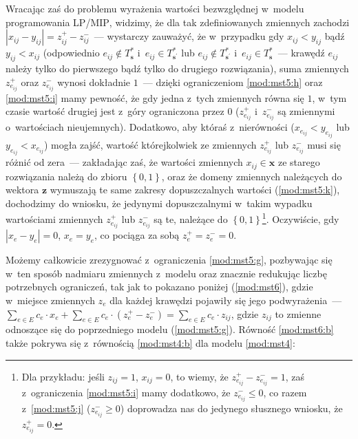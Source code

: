 Wracając zaś do problemu wyrażenia wartości bezwzględnej w~modelu programowania \textsc{LP}/\textsc{MIP}, widzimy, że dla tak zdefiniowanych zmiennych zachodzi $\left| x_{ij} - y_{ij} \right| = z_{ij}^{+} - z_{ij}^{-}$~--- wystarczy zauważyć, że w~przypadku gdy $x_{ij} < y_{ij}$ bądź $y_{ij} < x_{ij}$ (odpowiednio $e_{ij} \notin T^{\ast}_{\textbf{s}}$ i~$e_{ij} \in T^{\ast}_{\textbf{s}^{\prime}}$ lub $e_{ij} \notin T^{\ast}_{\textbf{s}^{\prime}}$ i~$e_{ij} \in T^{\ast}_{\textbf{s}}$~--- krawędź $e_{ij}$ należy tylko do pierwszego bądź tylko do drugiego rozwiązania), suma zmiennych $z_{e_{ij}}^{+}$ oraz $z_{e_{ij}}^{-}$ wynosi dokładnie $1$~--- dzięki ograniczeniom \ref{mod:mst5:h} oraz \ref{mod:mst5:i} mamy pewność, że gdy jedna z~tych zmiennych równa się $1$, w~tym czasie wartość drugiej jest z~góry ograniczona przez $0$ ($z^{+}_{e_{ij}}$ i~$z^{-}_{e_{ij}}$ są zmiennymi o~wartościach nieujemnych).
Dodatkowo, aby któraś z~nierówności ($x_{e_{ij}} < y_{e_{ij}}$ lub $y_{e_{ij}} < x_{e_{ij}}$) mogła zajść, wartość którejkolwiek ze zmiennych $z_{e_{ij}}^{+}$ lub $z_{e_{ij}}^{-}$ musi się różnić od zera~--- zakładając zaś, że wartości zmiennych $x_{ij} \in \textbf{x}$ ze starego rozwiązania należą do zbioru $\left\{ 0 , 1 \right\}$, oraz że domeny zmiennych należących do wektora $\textbf{z}$ wymuszają te same zakresy dopuszczalnych wartości (\ref{mod:mst5:k}), dochodzimy do wniosku, że jedynymi dopuszczalnymi w~takim wypadku wartościami zmiennych $z_{e_{ij}}^{+}$ lub $z_{e_{ij}}^{-}$ są te, należące do $\left\{ 0, 1 \right\}$\footnote{
	Dla przykładu: jeśli $z_{ij} = 1$, $x_{ij} = 0$, to wiemy, że $z_{e_{ij}}^{+} - z_{e_{ij}}^{-} = 1$, zaś z~ograniczenia \ref{mod:mst5:i} mamy dodatkowo, że $z_{e_{ij}}^{-} \leqslant 0$, co razem z~\ref{mod:mst5:j} ($z_{e_{ij}}^{-} \geqslant 0$) doprowadza nas do jedynego słusznego wniosku, że $z_{e_{ij}}^{+} = 0$.
}.
Oczywiście, gdy $\left| x_{e} - y_{e} \right| = 0$, $x_{e} = y_{e}$, co pociąga za sobą $z_{e}^{+} = z_{e}^{-} = 0$.

Możemy całkowicie zrezygnować z~ograniczenia \ref{mod:mst5:g}, pozbywając się w~ten sposób nadmiaru zmiennych z~modelu oraz znacznie redukując liczbę potrzebnych ograniczeń, tak jak to pokazano poniżej (\ref{mod:mst6}), gdzie w~miejsce zmiennych $z_{e}$ dla każdej krawędzi pojawiły się jego podwyrażenia~--- $\sum_{e \in E} c_{e} \cdot x_{e} + \sum_{e \in E} c_{e} \cdot \left( z^{+}_{e} - z^{-}_{e} \right) = \sum_{e \in E} c_{e} \cdot z_{ij}$, gdzie $z_{ij}$ to zmienne odnoszące się do poprzedniego modelu (\ref{mod:mst5:g}).
Równość \ref{mod:mst6:b} także pokrywa się z~równością \ref{mod:mst4:b} dla modelu \ref{mod:mst4}:

